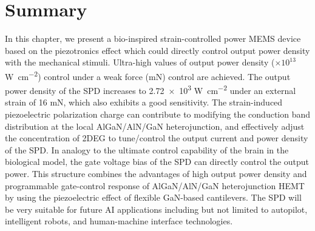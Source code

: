 \section{Summary}
\label{Summary}
In this chapter, we  present a bio-inspired strain-controlled power MEMS device based on the piezotronics effect which could directly control output power density with the mechanical stimuli. Ultra-high values of output power density ($\times 10^{13}$ \unit{\W\per\square\cm}) control under a weak force (\unit{mN}) control are achieved. The output power density of the SPD  increases to \num{2.72e3} \unit{\W\per\square\cm} under an external strain of 16 \unit{\mN}, which also exhibits a good sensitivity. The strain-induced piezoelectric polarization charge can contribute to modifying the conduction band  distribution at the local AlGaN/AlN/GaN heterojunction, and effectively adjust the concentration of 2DEG to tune/control the output current and power density of the SPD. In analogy to the ultimate control capability of the brain in the biological model, the gate voltage  bias of the SPD can directly control the output power. This structure combines the advantages of high output power density and programmable gate-control response of AlGaN/AlN/GaN heterojunction HEMT by using the piezoelectric effect of flexible GaN-based  cantilevers. The SPD  will be very suitable for future AI applications including but not limited to autopilot, intelligent robots, and human-machine interface technologies.





